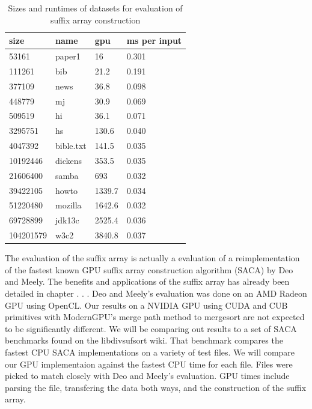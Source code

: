 \begin{table}[h]
\begin{tabular}{@{}llll@{}}
\toprule
size      & name      & gpu    & ms per input \\ \midrule
53161     & paper1    & 16     & 0.301        \\
111261    & bib       & 21.2   & 0.191        \\
377109    & news      & 36.8   & 0.098        \\
448779    & mj        & 30.9   & 0.069        \\
509519    & hi        & 36.1   & 0.071        \\
3295751   & hs        & 130.6  & 0.040        \\
4047392   & bible.txt & 141.5  & 0.035        \\
10192446  & dickens   & 353.5  & 0.035        \\
21606400  & samba     & 693    & 0.032        \\
39422105  & howto     & 1339.7 & 0.034        \\
51220480  & mozilla   & 1642.6 & 0.032        \\
69728899  & jdk13c    & 2525.4 & 0.036        \\
104201579 & w3c2      & 3840.8 & 0.037        \\ \bottomrule
\end{tabular}
\caption{Sizes and runtimes of datasets for evaluation of suffix array construction}
\label{tab:sadata}
\end{table}

The evaluation of the suffix array is actually a evaluation  of a reimplementation of the fastest known GPU suffix array construction algorithm (SACA) by Deo and Meely\cite{Deo}.
The benefits and applications of the suffix array has already been detailed in chapter . . .
Deo and Meely's evaluation was done on an AMD Radeon GPU using OpenCL.
Our results on a NVIDIA GPU using CUDA and CUB primitives with ModernGPU's merge path method to mergesort are not expected to be significantly different.
We will be comparing out results to a set of SACA benchmarks found on the libdivsufsort wiki.
That benchmark compares the fastest CPU SACA implementations on a variety of test files.
We will compare our GPU implementaion against the fastest CPU time for each file.
Files were picked to match closely with Deo and Meely's evaluation.
GPU times include parsing the file, transfering the data both ways, and the construction of the suffix array.

